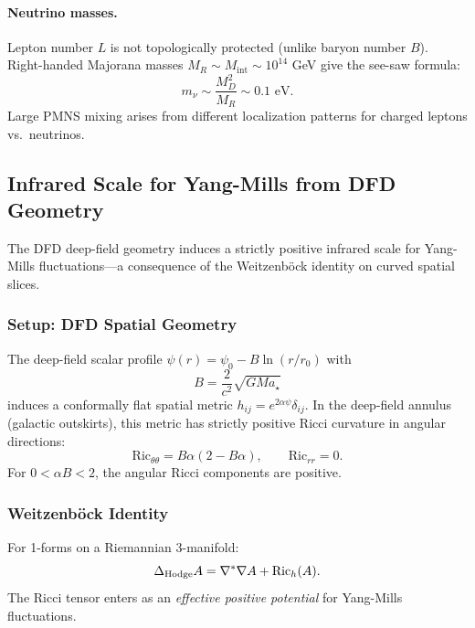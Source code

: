 \paragraph{Neutrino masses.}
Lepton number $L$ is not topologically protected (unlike baryon number $B$). Right-handed Majorana masses $M_R \sim M_{\text{int}} \sim 10^{14}$ GeV give the see-saw formula:
\begin{equation}
m_\nu \sim \frac{M_D^2}{M_R} \sim 0.1 \text{ eV}.
\end{equation}
Large PMNS mixing arises from different localization patterns for charged leptons vs.\ neutrinos.

\subsection{Infrared Scale for Yang-Mills from DFD Geometry}\label{sec:quantum-ym-ir}

The DFD deep-field geometry induces a strictly positive infrared scale for 
Yang-Mills fluctuations---a consequence of the Weitzenb\"ock identity on 
curved spatial slices.

\subsubsection{Setup: DFD Spatial Geometry}

The deep-field scalar profile $\psi(r) = \psi_0 - B\ln(r/r_0)$ with
\begin{equation}
B = \frac{2}{c^2}\sqrt{GMa_\star}
\end{equation}
induces a conformally flat spatial metric $h_{ij} = e^{2\alpha\psi}\delta_{ij}$. 
In the deep-field annulus (galactic outskirts), this metric has strictly 
positive Ricci curvature in angular directions:
\begin{equation}
\mathrm{Ric}_{\theta\theta} = B\alpha(2 - B\alpha), \qquad
\mathrm{Ric}_{rr} = 0.
\end{equation}
For $0 < \alpha B < 2$, the angular Ricci components are positive.

\subsubsection{Weitzenb\"ock Identity}

For 1-forms on a Riemannian 3-manifold:
\begin{equation}
\Delta_{\rm Hodge} A = \nabla^\ast\nabla A + \mathrm{Ric}_h(A).
\end{equation}
The Ricci tensor enters as an \textit{effective positive potential} for 
Yang-Mills fluctuations.

